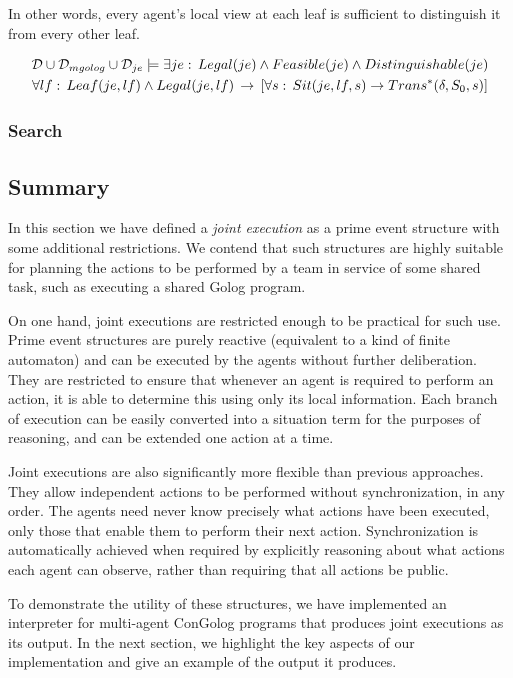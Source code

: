 In other words, every agent's local view at each leaf is sufficient
to distinguish it from every other leaf.

\begin{multline*}
\mathcal{D}\cup\mathcal{D}_{mgolog}\cup\mathcal{D}_{je}\models\exists je:\, Legal(je)\wedge Feasible(je)\wedge Distinguishable(je)\\
\forall lf:\, Leaf(je,lf)\wedge Legal(je,lf)\,\rightarrow\,\left[\forall s:\, Sit(je,lf,s)\rightarrow Trans^{*}(\delta,S_{0},s)\right]\end{multline*}



\subsubsection{Search}


\subsection{Summary\label{sec:JointExec:Summary}}

In this section we have defined a \emph{joint execution} as a prime
event structure with some additional restrictions. We contend that
such structures are highly suitable for planning the actions to be
performed by a team in service of some shared task, such as executing
a shared Golog program.

On one hand, joint executions are restricted enough to be practical
for such use. Prime event structures are purely reactive (equivalent
to a kind of finite automaton) and can be executed by the agents without
further deliberation. They are restricted to ensure that whenever
an agent is required to perform an action, it is able to determine
this using only its local information. Each branch of execution can
be easily converted into a situation term for the purposes of reasoning,
and can be extended one action at a time.

Joint executions are also significantly more flexible than previous
approaches. They allow independent actions to be performed without
synchronization, in any order. The agents need never know precisely
what actions have been executed, only those that enable them to perform
their next action. Synchronization is automatically achieved when
required by explicitly reasoning about what actions each agent can
observe, rather than requiring that all actions be public.

To demonstrate the utility of these structures, we have implemented
an interpreter for multi-agent ConGolog programs that produces joint
executions as its output. In the next section, we highlight the key
aspects of our implementation and give an example of the output it
produces.


